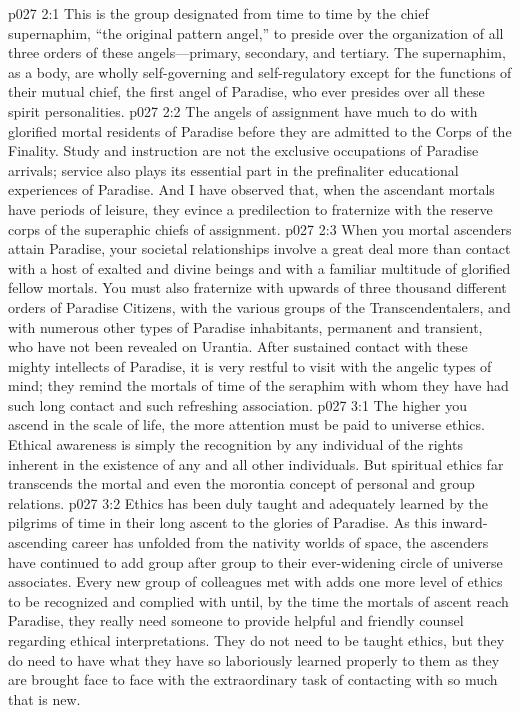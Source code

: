 \vs p027 2:1 This is the group designated from time to time by the chief supernaphim, “the original pattern angel,” to preside over the organization of all three orders of these angels---primary, secondary, and tertiary. The supernaphim, as a body, are wholly self\hyp{}governing and self\hyp{}regulatory except for the functions of their mutual chief, the first angel of Paradise, who ever presides over all these spirit personalities.
\vs p027 2:2 The angels of assignment have much to do with glorified mortal residents of Paradise before they are admitted to the Corps of the Finality. Study and instruction are not the exclusive occupations of Paradise arrivals; service also plays its essential part in the prefinaliter educational experiences of Paradise. And I have observed that, when the ascendant mortals have periods of leisure, they evince a predilection to fraternize with the reserve corps of the superaphic chiefs of assignment.\plusone
\vs p027 2:3 When you mortal ascenders attain Paradise, your societal relationships involve a great deal more than contact with a host of exalted and divine beings and with a familiar multitude of glorified fellow mortals. You must also fraternize with upwards of three thousand different orders of Paradise Citizens, with the various groups of the Transcendentalers, and with numerous other types of Paradise inhabitants, permanent and transient, who have not been revealed on Urantia. After sustained contact with these mighty intellects of Paradise, it is very restful to visit with the angelic types of mind; they remind the mortals of time of the seraphim with whom they have had such long contact and such refreshing association.
\vs p027 3:1 The higher you ascend in the scale of life, the more attention must be paid to universe ethics. Ethical awareness is simply the recognition by any individual of the rights inherent in the existence of any and all other individuals. But spiritual ethics far transcends the mortal and even the morontia concept of personal and group relations.
\vs p027 3:2 Ethics has been duly taught and adequately learned by the pilgrims of time in their long ascent to the glories of Paradise. As this inward\hyp{}ascending career has unfolded from the nativity worlds of space, the ascenders have continued to add group after group to their ever\hyp{}widening circle of universe associates. Every new group of colleagues met with adds one more level of ethics to be recognized and complied with until, by the time the mortals of ascent reach Paradise, they really need someone to provide helpful and friendly counsel regarding ethical interpretations. They do not need to be taught ethics, but they do need to have what they have so laboriously learned properly  to them as they are brought face to face with the extraordinary task of contacting with so much that is new.
